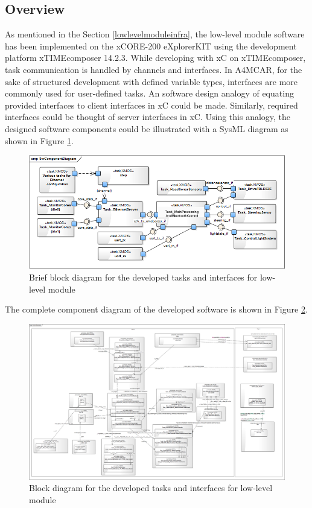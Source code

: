 \subsection{Overview} \label{lloverviewsection}
As mentioned in the Section \ref{lowlevelmoduleinfra}, the low-level module software has been implemented on the xCORE-200 eXplorerKIT using the development platform xTIMEcomposer 14.2.3. While developing with xC on xTIMEcomposer, task communication is handled by channels and interfaces. In A4MCAR, for the sake of structured development with defined variable types, interfaces are more commonly used for user-defined tasks. An software design analogy of equating provided interfaces to client interfaces in xC could be made. Similarly, required interfaces could be thought of server interfaces in xC. Using this analogy, the designed software components could be illustrated with a SysML \cite{sysml} diagram as shown in Figure \ref{fig:sysmlxmostasksbrief}.
\begin{figure}[!ht]
	\centering
	\captionsetup{justification=centering}
	\includegraphics[width=\textwidth]{content/images/sysmlxmostasksbrief.png}
	\caption{Brief block diagram for the developed tasks and interfaces for low-level module}
	\label{fig:sysmlxmostasksbrief}
\end{figure}

The complete component diagram of the developed software is shown in Figure \ref{fig:sysmlxmostasks}.

\begin{figure}[!ht]
	\centering
	\captionsetup{justification=centering}
	\includegraphics[scale=0.21]{content/images/sysmlxmostasks.png}
	\caption{Block diagram for the developed tasks and interfaces for low-level module}
	\label{fig:sysmlxmostasks}
\end{figure}

